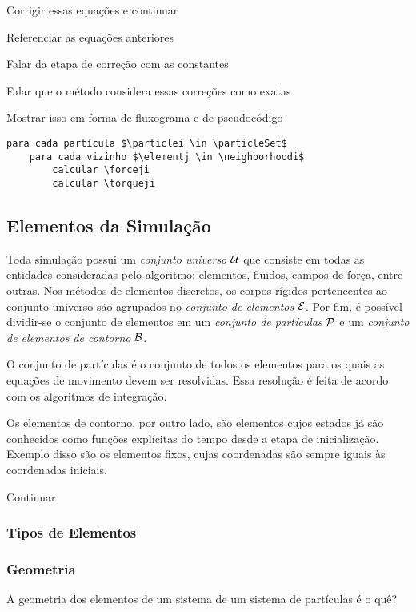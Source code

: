 \alert{Corrigir essas equações e continuar}

\alert{Referenciar as equações anteriores}

\alert{Falar da etapa de correção com as constantes}

\alert{Falar que o método considera essas correções como exatas}

\alert{Mostrar isso em forma de fluxograma e de pseudocódigo}

\begin{lstlisting}[style=pseudocode]
para cada partícula $\particlei \in \particleSet$
	para cada vizinho $\elementj \in \neighborhoodi$
		calcular \forceji
		calcular \torqueji
\end{lstlisting}

\subsection{Elementos da Simulação}

Toda simulação possui um \textit{conjunto universo} \(\mathcal{U}\) que consiste em todas as entidades consideradas pelo algoritmo: elementos, fluidos, campos de força, entre outras. Nos métodos de elementos discretos, os corpos rígidos pertencentes ao conjunto universo são agrupados no \textit{conjunto de elementos} \(\mathcal{E}\). Por fim, é possível dividir-se o conjunto de elementos em um \textit{conjunto de partículas} \(\mathcal{P}\) e um \textit{conjunto de elementos de contorno} \(\mathcal{B}\).

O conjunto de partículas é o conjunto de todos os elementos para os quais as equações de movimento devem ser resolvidas. Essa resolução é feita de acordo com os algoritmos de integração. 

Os elementos de contorno, por outro lado, são elementos cujos estados já são conhecidos como funções explícitas do tempo desde a etapa de inicialização. Exemplo disso são os elementos fixos, cujas coordenadas são sempre iguais às coordenadas iniciais.

\alert{Continuar}

\subsubsection{Tipos de Elementos}
\subsubsection{Geometria}

A geometria dos elementos de um sistema de um sistema de partículas é \alert{o quê?}

